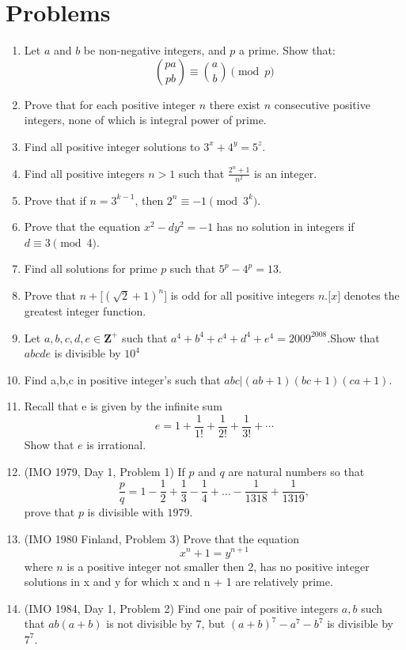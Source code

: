 \documentclass[a4paper,oneside,12 pt]{book}
\theoremstyle{definition}
\theoremstyle{definition}
\theoremstyle{definition}
\begin{document}
\section{Problems}
\begin{enumerate}
\item Let $a$ and $b$ be non-negative integers, and $p$ a prime. Show that:
$${ \binom{pa}{pb} }\equiv {\binom{a}{b}} \pmod{p}$$
\item Prove that for each positive integer $n$ there exist $n$ consecutive positive integers, none of which is integral power of prime.
\item Find all positive integer solutions to $3^x+4^y=5^z$.
\item Find all positive integers $n>1$ such that $\frac{2^n+1}{n^2}$ is an integer.
\item Prove that if $n=3^{k-1}$, then $2^n\equiv -1\pmod{3^k}$.
\item Prove that the equation $x^2-dy^2=-1$ has no solution in integers if $d\equiv 3{\pmod 4}$.
\item Find all solutions for prime $p$ such that $5^p-4^p=13$.
\item Prove that $n + \big[ (\sqrt{2} + 1)^n\big] $ is odd for all positive integers $n$.$\big[ x \big]$ denotes the greatest integer function.
\item Let $a,b,c,d,e\in \textbf{Z}^+$ such that ${{a}^{4}}+{{b}^{4}}+{{c}^{4}}+{{d}^{4}}+{{e}^{4}}={{2009}^{2008}}$.Show that $abcde$ is divisible by ${{10}^{4}}$
\item Find a,b,c in positive integer's such that $abc|(ab+1)(bc+1)(ca+1)$.
\item Recall that e is given by the infinite sum 
$$e = 1+\frac{1}{1!}+\frac{1}{2!}+\frac{1}{3!}+\cdots$$
Show that $e$ is irrational.
\item (IMO 1979, Day 1, Problem 1) If $p$ and $q$ are natural numbers so that \[ \frac{p}{q}=1-\frac{1}{2}+\frac{1}{3}-\frac{1}{4}+ \ldots -\frac{1}{1318}+\frac{1}{1319}, \] prove that $p$ is divisible with $1979$.
\item (IMO 1980 Finland, Problem 3) Prove that the equation $$x^n+1=y^{n+1}$$
where $n$ is a positive integer not smaller then $2$, has no positive integer solutions
in x and y for which x and n + 1 are relatively prime.

\item (IMO 1984, Day 1, Problem 2) Find one pair of positive integers $a,b$ such that $ab(a+b)$ is not divisible by $7$, but $(a+b)^7 −a^7 −b^7$  is divisible by $7^7$.


\end{enumerate}
\end{document}
